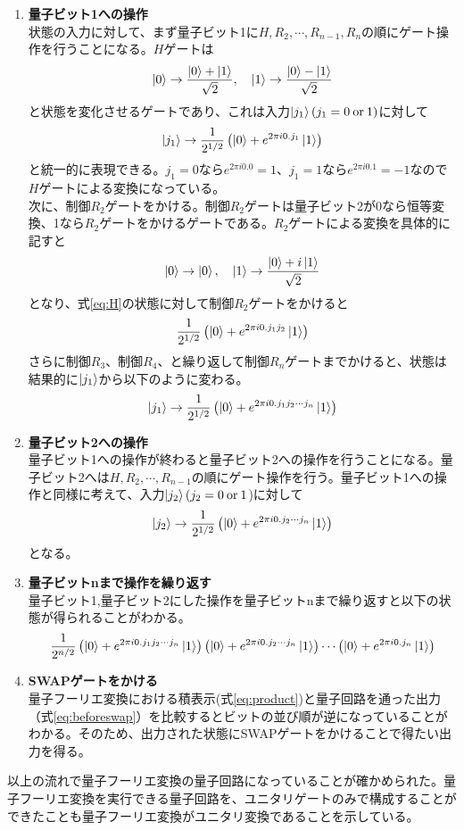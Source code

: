 \documentclass[dvipdfmx]{jsarticle}
\begin{document}
\begin{enumerate}[label = (\arabic*)]
    \item \textbf{量子ビット1への操作}\\
    状態の入力に対して、まず量子ビット1に$H,R_2,\cdots, R_{n-1},R_n$の順にゲート操作を行うことになる。$H$ゲートは
    \[
        \ket{0}\rightarrow \frac{\ket{0}+\ket{1}}{\sqrt{2}},\quad\ket{1}\rightarrow \frac{\ket{0}-\ket{1}}{\sqrt{2}}
    \]
    と状態を変化させるゲートであり、これは入力$\ket{j_1}(j_1=0\:\text{or}\:1)$に対して
    \[
        \ket{j_1}\rightarrow \frac{1}{2^{1/2}}\left(\ket{0}+e^{2\pi i0.j_1}\ket{1}\right)\label{eq:H}
    \]
    と統一的に表現できる。$j_1=0$なら$e^{2\pi i 0.0}= 1$、$j_1=1$なら$e^{2\pi i0.1}=-1$なので$H$ゲートによる変換になっている。\\
    次に、制御$R_2$ゲートをかける。制御$R_2$ゲートは量子ビット2が0なら恒等変換、1なら$R_2$ゲートをかけるゲートである。$R_2$ゲートによる変換を具体的に記すと
    \[
        \ket{0}\rightarrow \ket{0},\quad \ket{1}\rightarrow \frac{\ket{0}+i\ket{1}}{\sqrt{2}}
    \]
    となり、式\ref{eq:H}の状態に対して制御$R_2$ゲートをかけると
    \[
        \frac{1}{2^{1/2}}\left(\ket{0}+e^{2\pi i0.j_1j_2}\ket{1}\right)
    \]
    さらに制御$R_3$、制御$R_4$、と繰り返して制御$R_n$ゲートまでかけると、状態は結果的に$\ket{j_1}$から以下のように変わる。
    \[
        \ket{j_1}\rightarrow \frac{1}{2^{1/2}}\left(\ket{0}+e^{2\pi i0.j_1j_2\cdots j_n}\ket{1}\right)
    \]
    \item \textbf{量子ビット2への操作}\\
    量子ビット1への操作が終わると量子ビット2への操作を行うことになる。量子ビット2へは$H,R_2,\cdots,R_{n-1}$の順にゲート操作を行う。量子ビット1への操作と同様に考えて、入力$\ket{j_2}(j_2=0\:\text{or}\:1$)に対して
    \[  
        \ket{j_2} \rightarrow \frac{1}{2^{1/2}}\left(\ket{0}+e^{2\pi i0.j_2\cdots j_n}\ket{1}\right)
    \]
    となる。
    \item \textbf{量子ビットnまで操作を繰り返す}\\
    量子ビット1,量子ビット2にした操作を量子ビットnまで繰り返すと以下の状態が得られることがわかる。
    \begin{equation}
        \frac{1}{2^{n/2}}\left(\ket{0}+e^{2\pi i0.j_1j_2\cdots j_n}\ket{1}\right)\left(\ket{0}+e^{2\pi i0.j_2\cdots j_n}\ket{1}\right)\cdots \left(\ket{0}+e^{2\pi i0.j_n}\ket{1}\right)\label{eq:beforeswap}
    \end{equation}
    \item \textbf{SWAPゲートをかける}\\
    量子フーリエ変換における積表示(式\ref{eq:product})と量子回路を通った出力（式\ref{eq:beforeswap}）を比較するとビットの並び順が逆になっていることがわかる。そのため、出力された状態にSWAPゲートをかけることで得たい出力を得る。
\end{enumerate}
以上の流れで量子フーリエ変換の量子回路になっていることが確かめられた。量子フーリエ変換を実行できる量子回路を、ユニタリゲートのみで構成することができたことも量子フーリエ変換がユニタリ変換であることを示している。
\vspace{5mm}
\end{document}
